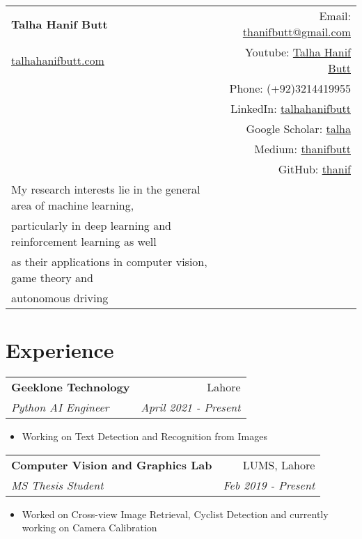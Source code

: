 \documentclass[letterpaper,11pt]{article}
\makeatletter
\newcommand{\resumeSubheading}[4]{
  \vspace{-1pt}\item
    \begin{tabular*}{0.97\textwidth}[t]{l@{\extracolsep{\fill}}r}
      \textbf{#1} & #2 \\
      \textit{\small#3} & \textit{\small #4} \\
    \end{tabular*}\vspace{-5pt}
}
\makeatother
\begin{document}
\begin{tabular*}{\textwidth}{l@{\extracolsep{\fill}}r}
  \textbf{{\Large Talha Hanif Butt}} & Email: \href{mailto:thanifbutt@gmail.com}{thanifbutt@gmail.com}\\
  \href{https://sites.google.com/view/talhahanifbutt}{talhahanifbutt.com}& Youtube: \href{https://www.youtube.com/channel/UCcXj3DvzVAuDrDsO4CvcO6w}{Talha Hanif Butt}\\& Phone: {(+92)3214419955}\\ & LinkedIn: \href{https://pk.linkedin.com/in/talhahanifbutt}{talhahanifbutt}\\
& Google Scholar: \href{https://scholar.google.com/citations?hl=en&user=2OZ4dKsAAAAJ}{talha}\\
& Medium: \href{https://medium.com/@thanifbutt}{thanifbutt}\\  
& GitHub: \href{https://github.com/thanif}{thanif}\\


My research interests lie in the general area of machine learning,\\ particularly in deep learning and reinforcement learning as well\\ as their applications in computer vision, game theory and\\ autonomous driving


\end{tabular*}


\section{Experience}

			\resumeSubheading
      			{Geeklone Technology}{Lahore}
      			{Python AI Engineer}{April 2021 - Present}
      
        \begin{itemize}
  				\item Working on Text Detection and Recognition from Images
			\end{itemize}

			\resumeSubheading
      			{Computer Vision and Graphics Lab}{LUMS, Lahore}
      			{MS Thesis Student}{Feb 2019 - Present}
      
        
          \begin{itemize}
  				\item Worked on Cross-view Image Retrieval, Cyclist Detection and currently working on Camera Calibration
			\end{itemize}
\end{document}
